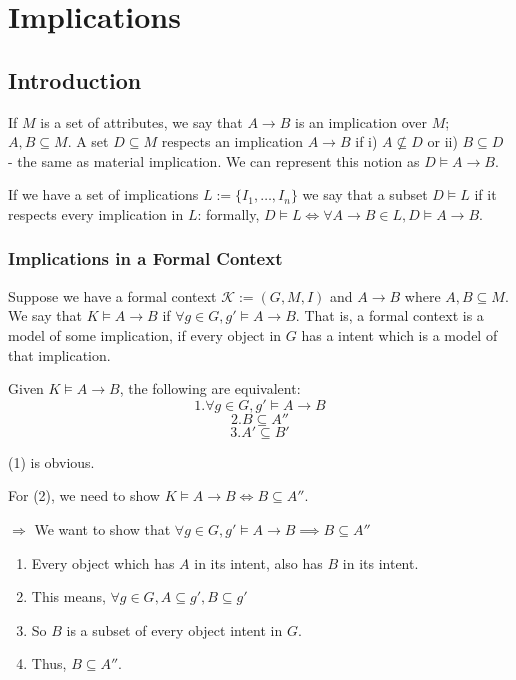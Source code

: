 \section{Implications}
\label{sec:Implications}

\subsection{Introduction}
If $M$ is a set of attributes, we say that $A \rightarrow B$ is an implication over $M$; $A,B \subseteq M$. A set $D\subseteq M$ respects an implication $A \rightarrow B$ if i) $A \not \subseteq D$ or ii) $B \subseteq D$ - the same as material implication. We can represent this notion as $D \models A \rightarrow B$. 

If we have a set of implications $L := \{I_1,\dots ,I_n\}$ we say that a subset $D \models L$ if it respects every implication in $L$: formally, $D \models L \iff \forall A \rightarrow B \in L, D \models A \rightarrow B$. 

\subsubsection{Implications in a Formal Context}
Suppose we have a formal context $\mathcal{K} := (G, M, I)$ and $A \rightarrow B$ where  $A, B \subseteq M$. We say that $K \models A \rightarrow B$ if $\forall g \in G, g' \models A \rightarrow B$. That is, a formal context is a model of some implication, if every object in $G$ has a intent which is a model of that implication. 

Given $K \models A \rightarrow B$, the following are equivalent: 
\[1. \forall g \in G, g' \models A\rightarrow B \]
\[2. B \subseteq A''\]
\[3. A' \subseteq B'\]

(1) is obvious. 

For (2), we need to show $K \models A \rightarrow B \iff B \subseteq A''$. 

$\Rightarrow$ We want to show that $\forall g \in G, g' \models A \rightarrow B \implies B \subseteq A''$ 
\begin{enumerate}
    \item Every object which has $A$ in its intent, also has $B$ in its intent. 
    \item This means, $\forall g \in G, A \subseteq g', B \subseteq g'$
    \item So $B$ is a subset of every object intent in $G$. 
    \item Thus, $B \subseteq A''$. 
\end{enumerate}

